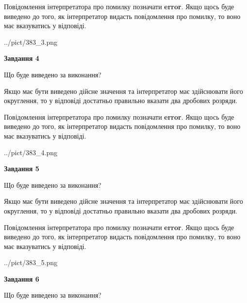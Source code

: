 \documentclass[12pt, ukrainian]{article}
\begin{document}
{\begin {Large}
Повідомлення інтерпретатора про помилку позначати \textbf{error}.
Якщо щось буде виведено до того, як інтерпретатор видасть повідомлення про помилку, 
то воно має вказуватись у відповіді. \par

\begin{center}
	{../pict/383_3.png}
\end{center}
\newpage

{\begin {center}\textbf{Завдання 4}\end {center}}\par
Що буде виведено за виконання? \par

Якщо має бути виведено дійсне значення та інтерпретатор має здійснювати його округлення, 
то у відповіді достатньо правильно вказати два дробових розряди.

Повідомлення інтерпретатора про помилку позначати \textbf{error}.
Якщо щось буде виведено до того, як інтерпретатор видасть повідомлення про помилку, 
то воно має вказуватись у відповіді. \par

\begin{center}
	{../pict/383_4.png}
\end{center}
\newpage

{\begin {center}\textbf{Завдання 5}\end {center}}\par
Що буде виведено за виконання? \par

Якщо має бути виведено дійсне значення та інтерпретатор має здійснювати його округлення, 
то у відповіді достатньо правильно вказати два дробових розряди.

Повідомлення інтерпретатора про помилку позначати \textbf{error}.
Якщо щось буде виведено до того, як інтерпретатор видасть повідомлення про помилку, 
то воно має вказуватись у відповіді. \par

\begin{center}
	{../pict/383_5.png}
\end{center}
\newpage

{\begin {center}\textbf{Завдання 6}\end {center}}\par
Що буде виведено за виконання? \par


\end{Large}}
\end{document}
